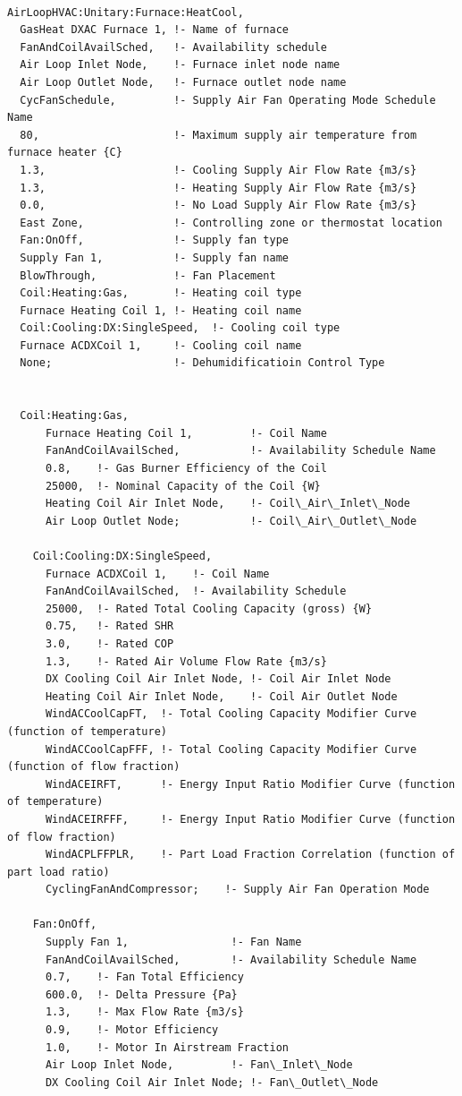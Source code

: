 \begin{lstlisting}

AirLoopHVAC:Unitary:Furnace:HeatCool,
  GasHeat DXAC Furnace 1, !- Name of furnace
  FanAndCoilAvailSched,   !- Availability schedule
  Air Loop Inlet Node,    !- Furnace inlet node name
  Air Loop Outlet Node,   !- Furnace outlet node name
  CycFanSchedule,         !- Supply Air Fan Operating Mode Schedule Name
  80,                     !- Maximum supply air temperature from furnace heater {C}
  1.3,                    !- Cooling Supply Air Flow Rate {m3/s}
  1.3,                    !- Heating Supply Air Flow Rate {m3/s}
  0.0,                    !- No Load Supply Air Flow Rate {m3/s}
  East Zone,              !- Controlling zone or thermostat location
  Fan:OnOff,              !- Supply fan type
  Supply Fan 1,           !- Supply fan name
  BlowThrough,            !- Fan Placement
  Coil:Heating:Gas,       !- Heating coil type
  Furnace Heating Coil 1, !- Heating coil name
  Coil:Cooling:DX:SingleSpeed,  !- Cooling coil type
  Furnace ACDXCoil 1,     !- Cooling coil name
  None;                   !- Dehumidificatioin Control Type


  Coil:Heating:Gas,
      Furnace Heating Coil 1,         !- Coil Name
      FanAndCoilAvailSched,           !- Availability Schedule Name
      0.8,    !- Gas Burner Efficiency of the Coil
      25000,  !- Nominal Capacity of the Coil {W}
      Heating Coil Air Inlet Node,    !- Coil\_Air\_Inlet\_Node
      Air Loop Outlet Node;           !- Coil\_Air\_Outlet\_Node

    Coil:Cooling:DX:SingleSpeed,
      Furnace ACDXCoil 1,    !- Coil Name
      FanAndCoilAvailSched,  !- Availability Schedule
      25000,  !- Rated Total Cooling Capacity (gross) {W}
      0.75,   !- Rated SHR
      3.0,    !- Rated COP
      1.3,    !- Rated Air Volume Flow Rate {m3/s}
      DX Cooling Coil Air Inlet Node, !- Coil Air Inlet Node
      Heating Coil Air Inlet Node,    !- Coil Air Outlet Node
      WindACCoolCapFT,  !- Total Cooling Capacity Modifier Curve (function of temperature)
      WindACCoolCapFFF, !- Total Cooling Capacity Modifier Curve (function of flow fraction)
      WindACEIRFT,      !- Energy Input Ratio Modifier Curve (function of temperature)
      WindACEIRFFF,     !- Energy Input Ratio Modifier Curve (function of flow fraction)
      WindACPLFFPLR,    !- Part Load Fraction Correlation (function of part load ratio)
      CyclingFanAndCompressor;    !- Supply Air Fan Operation Mode

    Fan:OnOff,
      Supply Fan 1,                !- Fan Name
      FanAndCoilAvailSched,        !- Availability Schedule Name
      0.7,    !- Fan Total Efficiency
      600.0,  !- Delta Pressure {Pa}
      1.3,    !- Max Flow Rate {m3/s}
      0.9,    !- Motor Efficiency
      1.0,    !- Motor In Airstream Fraction
      Air Loop Inlet Node,         !- Fan\_Inlet\_Node
      DX Cooling Coil Air Inlet Node; !- Fan\_Outlet\_Node


\end{lstlisting}
